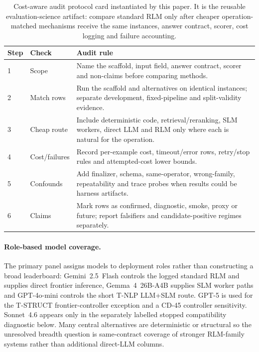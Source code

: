\documentclass[letterpaper]{article}
\begin{document}
\begin{table}[!htbp]
\centering
\small
\setlength{\tabcolsep}{3pt}
\begin{tabular}{@{}p{0.75cm}p{1.8cm}p{4.4cm}@{}}
\toprule
\textbf{Step} & \textbf{Check} & \textbf{Audit rule} \\
\midrule
1 & Scope & Name the scaffold, input field, answer contract, scorer and non-claims before comparing methods. \\
2 & Match rows & Run the scaffold and alternatives on identical instances; separate development, fixed-pipeline and split-validity evidence. \\
3 & Cheap route & Include deterministic code, retrieval/reranking, SLM workers, direct LLM and RLM only where each is natural for the operation. \\
4 & Cost/failures & Record per-example cost, timeout/error rows, retry/stop rules and attempted-cost lower bounds. \\
5 & Confounds & Add finalizer, schema, same-operator, wrong-family, repeatability and trace probes when results could be harness artifacts. \\
6 & Claims & Mark rows as confirmed, diagnostic, smoke, proxy or future; report falsifiers and candidate-positive regimes separately. \\
\bottomrule
\end{tabular}
\caption{Cost-aware audit protocol card instantiated by this paper. It is the reusable evaluation-science artifact: compare standard RLM only after cheaper operation-matched mechanisms receive the same instances, answer contract, scorer, cost logging and failure accounting.}
\label{tab:supp-cost-aware-audit-protocol}
\end{table}

\paragraph{Role-based model coverage.}
The primary panel assigns models to deployment roles rather than constructing a broad leaderboard: Gemini~2.5~Flash controls the logged standard RLM and supplies direct frontier inference, Gemma~4~26B-A4B supplies SLM worker paths and GPT-4o-mini controls the short T-NLP LLM+SLM route. GPT-5 is used for the T-STRUCT frontier-controller exception and a CD-45 controller sensitivity. Sonnet~4.6 appears only in the separately labelled stopped compatibility diagnostic below. Many central alternatives are deterministic or structural so the unresolved breadth question is same-contract coverage of stronger RLM-family systems rather than additional direct-LLM columns.
\end{document}
